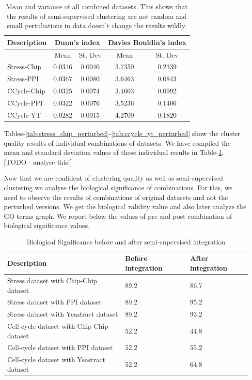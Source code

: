 \begin{table}
\centering
\begin{tabular}{|l|c|c|c|c|}
\hline
Description & \multicolumn{2}{|c|}{Dunn’s index}  & \multicolumn{2}{|c|}{Davies Bouldin’s index}\\
\hline
 & Mean & St. Dev & Mean & St. Dev\\
\hline
Stress-Chip & 0.0316 & 0.0040 & 3.7359 & 0.2339 \\
Stress-PPI & 0.0367 & 0.0080 & 3.6463 & 0.0843 \\
\hline
CCycle-Chip & 0.0325 & 0.0074 & 3.4603 & 0.0992 \\
CCycle-PPI & 0.0322 & 0.0076 & 3.5236 & 0.1406 \\
CCycle-YT & 0.0282 & 0.0015 & 4.2709 & 0.1820 \\
\hline 
\end{tabular}
\caption{Mean and variance of all combined datasets. This shows that the results of semi-supervised clustering are not random and small pertubations in data doesn’t change the results wildly.}
\label{tab:mean_stdev_combined_perturbed}
\end{table}

Tables-\ref{tab:stress_chip_perturbed}-\ref{tab:ccycle_yt_perturbed} show the cluster quality results of individual combinations of datasets. We have compiled the mean and standard deviation values of these 
individual results in Table-\ref{tab:mean_stdev_combined_perturbed}. [TODO - analyse this!]

Now that we are confident of clustering quality as well as semi-supervised clustering we analyse the biological significance of combinations. For this, we need to observe the results of combinations of original datasets 
and not the perturbed versions. We get the biological validity value and also later analyze the GO terms graph. We report below the values of pre and post combination of biological significance values.

\begin{table}
\centering
\begin{tabular}{|l|l|l|}
\hline
Description & Before integration & After integration\\
\hline
Stress dataset with Chip-Chip dataset & 89.2 & 86.7 \\
Stress dataset with PPI dataset & 89.2 & 95.2 \\
Stress dataset with Yeastract dataset & 89.2 & 93.2 \\
Cell-cycle dataset with Chip-Chip dataset & 52.2 & 44.8 \\
Cell-cycle dataset with PPI dataset & 52.2 & 55.2 \\
Cell-cycle dataset with Yeastract dataset & 52.2 & 64.8\\
\hline 
\end{tabular}
\caption{Biological Significance before and after semi-supervised integration}
\label{tab:no_constraints}
\end{table}

